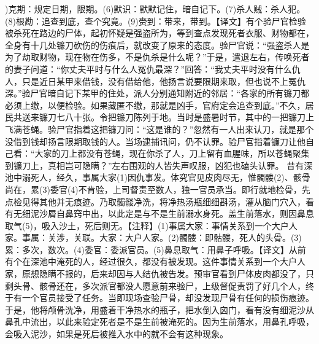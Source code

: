 \documentclass[12pt,UTF8]{ctexbook}
\begin{document}
)克期：规定日期，限期。(6)默识：默默记住，暗自记下。(7)杀人贼：杀人犯。(8)根勘：追查到底，查个究竟。(9)赍到：带来，带到。【译文】有个验尸官检验被杀死在路边的尸体，起初怀疑是强盗所为，等到查点发现死者衣服、财物都在，全身有十几处镰刀砍伤的伤痕后，就改变了原来的态度。验尸官说：“强盗杀人是为了劫取财物，现在物在伤多，不是仇杀是什么呢？”于是，遣退左右，传唤死者的妻子问道：“你丈夫平时与什么人冤仇最深？”回答：“我丈夫平时没有什么仇人，只是近日某甲来借钱，没有借给他，他扬言说要限期来取，但也说不上冤仇深。”验尸官暗自记下某甲的住处，派人分别通知附近的邻居：“各家的所有镰刀都必须上缴，以便检验。如果藏匿不缴，那就是凶手，官府定会追查到底。”不久，居民共送来镰刀七八十张。令把镰刀陈列于地。当时是盛暑时节，其中的一把镰刀上飞满苍蝇。验尸官指着这把镰刀问：“这是谁的？”忽然有一人出来认刀，就是那个没借到钱却扬言限期取钱的人。当场逮捕讯问，仍不认罪。验尸官指着镰刀让他自己看：“大家的刀上都没有苍蝇，现在你杀了人，刀上留有血腥味，所以苍蝇聚集到镰刀上，真相岂可隐瞒？”左右围观的人皆失声叹服，凶犯也磕头认罪。
昔有深池中溺死人，经久，事属大家(1)因仇事发。体究官见皮肉尽无，惟髑髅(2)、骸骨尚在，累(3)委官(4)不肯验，上司督责至数人，独一官员承当。即行就地检骨，先点检见得其他并无痕迹。乃取髑髅净洗，将净热汤瓶细细斟汤，灌从脑门穴入，看有无细泥沙屑自鼻窍中出，以此定是与不是生前溺水身死。盖生前落水，则因鼻息取气(5)，吸入沙土，死后则无。【注释】(1)事属大家：事情关系到一个大户人家。事属：关涉，关联。大家：大户人家。(2)髑髅：即骷髅，死人的头骨。(3)累：多次，数次。(4)委官：委派官员。(5)鼻息取气：用鼻子呼吸。【译文】从前有个在深池中淹死的人，经过很久，都没有被发现。这件事情关系到一个大户人家，原想隐瞒不报的，后来却因与人结仇被告发。预审官看到尸体皮肉都没了，只剩头骨、骸骨还在，多次派官都没人愿意前来验尸，上级督促责罚了好几个人，终于有一个官员接受了任务。当即现场查验尸骨，却没发现尸骨有任何的损伤痕迹。于是，他将颅骨洗净，用盛着干净热水的瓶子，把水倒入囟门，看有没有细泥沙从鼻孔中流出，以此来验定死者是不是生前被淹死的。因为生前落水，用鼻孔呼吸，会吸入泥沙，如果是死后被推入水中的就不会有这种现象。
\end{document}
